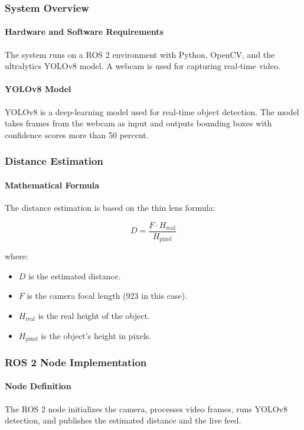 \documentclass[english,project]{buwthesis}
\begin{document}
\subsubsection{System Overview}
\paragraph{Hardware and Software Requirements}
The system runs on a ROS 2 environment with Python, OpenCV, and the ultralytics YOLOv8 model. A webcam is used for capturing real-time video.

\paragraph{YOLOv8 Model}
YOLOv8 is a deep-learning model used for real-time object detection. The model takes frames from the webcam as input and outputs bounding boxes with confidence scores more than 50 percent.

\subsubsection{Distance Estimation}
\paragraph{Mathematical Formula}
The distance estimation is based on the thin lens formula:

\begin{equation}
D = \frac{F \cdot H_{\text{real}}}{H_{\text{pixel}}}
\end{equation}

where:
\begin{itemize}
    \item \( D \) is the estimated distance.
    \item \( F \) is the camera focal length (923 in this case).
    \item \( H_{\text{real}} \) is the real height of the object.
    \item \( H_{\text{pixel}} \) is the object's height in pixels.
\end{itemize}

\subsubsection{ROS 2 Node Implementation}
\paragraph{Node Definition}
The ROS 2 node initializes the camera, processes video frames, runs YOLOv8 detection, and publishes the estimated distance and the live feed.
\end{document}
